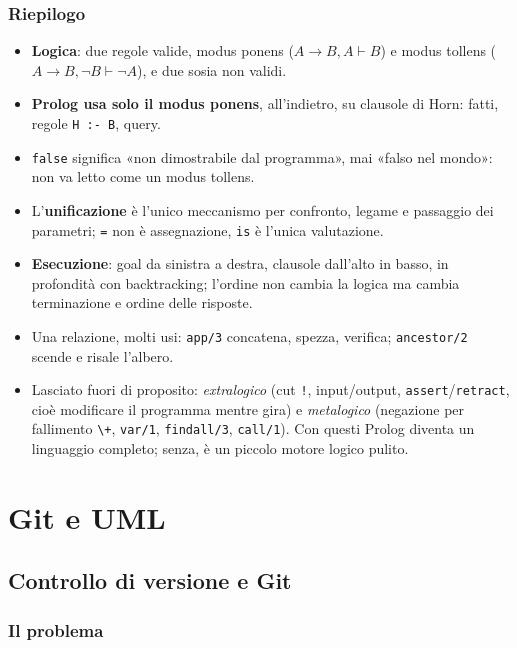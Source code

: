 \documentclass[a4paper,12pt]{article}
\begin{document}
\subsubsection{Riepilogo}
\begin{itemize}[nosep]
  \item \textbf{Logica}: due regole valide, modus ponens ($A \to B, A \vdash B$) e modus tollens
        ($A \to B, \neg B \vdash \neg A$), e due sosia non validi.
  \item \textbf{Prolog usa solo il modus ponens}, all'indietro, su clausole di Horn: fatti,
        regole \texttt{H :- B}, query.
  \item \texttt{false} significa «non dimostrabile dal programma», mai «falso nel mondo»: non va
        letto come un modus tollens.
  \item L'\textbf{unificazione} è l'unico meccanismo per confronto, legame e passaggio dei
        parametri; \texttt{=} non è assegnazione, \texttt{is} è l'unica valutazione.
  \item \textbf{Esecuzione}: goal da sinistra a destra, clausole dall'alto in basso, in profondità
        con backtracking; l'ordine non cambia la logica ma cambia terminazione e ordine delle
        risposte.
  \item Una relazione, molti usi: \texttt{app/3} concatena, spezza, verifica;
        \texttt{ancestor/2} scende e risale l'albero.
  \item Lasciato fuori di proposito: \emph{extralogico} (cut \texttt{!}, input/output,
        \texttt{assert}/\texttt{retract}, cioè modificare il programma mentre gira) e
        \emph{metalogico} (negazione per fallimento \texttt{\textbackslash+}, \texttt{var/1},
        \texttt{findall/3}, \texttt{call/1}). Con questi Prolog diventa un linguaggio completo;
        senza, è un piccolo motore logico pulito.
\end{itemize}

\section{Git e UML}
\subsection{Controllo di versione e Git}
\subsubsection{Il problema}
\end{document}
